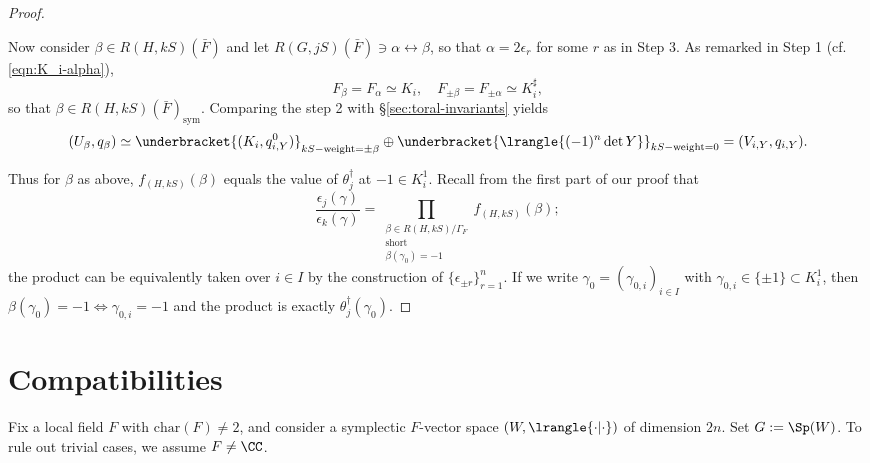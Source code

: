 \documentclass[a4paper,10pt]{article}
\begin{document}
\begin{proof}
\begin{asparaenum}
		Now consider $\beta \in R(H, kS)(\bar{F})$ and let $R(G, jS)(\bar{F}) \ni \alpha \leftrightarrow \beta$, so that $\alpha = 2\epsilon_r$ for some $r$ as in Step 3.  As remarked in Step 1 (cf. \eqref{eqn:K_i-alpha}),
		\[ F_\beta = F_\alpha \simeq K_i, \quad F_{\pm\beta} = F_{\pm\alpha} \simeq K_i^\sharp, \]
		so that $\beta \in R(H, kS)(\bar{F})_\text{sym}$. Comparing the step 2 with \S\ref{sec:toral-invariants} yields
		\[ (U_\beta, q_\beta) \simeq \underbracket{(K_i, q_{i,Y}^0)}_{ kS-\text{weight}=\pm\beta } \oplus \underbracket{\lrangle{(-1)^n \det Y}}_{kS-\text{weight}=0} = (V_{i,Y}, q_{i,Y}). \]
	\end{asparaenum}

	Thus for $\beta$ as above, $f_{(H, kS)}(\beta)$ equals the value of $\theta^\dagger_j$ at $-1 \in K_i^1$. Recall from the first part of our proof that
	\[ \dfrac{\epsilon_j(\gamma)}{\epsilon_k(\gamma)} = \prod_{\substack{\beta \in R(H, kS)/\Gamma_F \\ \text{short} \\ \beta(\gamma_0) = -1 }} f_{(H,kS)}(\beta); \]
	the product can be equivalently taken over $i \in I$ by the construction of $\{\epsilon_{\pm r}\}_{r=1}^n$. If we write $\gamma_0 = (\gamma_{0,i})_{i \in I}$ with $\gamma_{0,i} \in \{\pm 1\} \subset K_i^1$, then $\beta(\gamma_0) = -1 \iff \gamma_{0,i} = -1$ and the product is exactly $\theta^\dagger_j(\gamma_0)$.
\end{proof}

\section{Compatibilities}\label{sec:compatibilities}
Fix a local field $F$ with $\text{char}(F) \neq 2$, and consider a symplectic $F$-vector space $(W, \lrangle{\cdot|\cdot})$ of dimension $2n$. Set $G := \Sp(W)$. To rule out trivial cases, we assume $F \neq \CC$.
\end{document}
